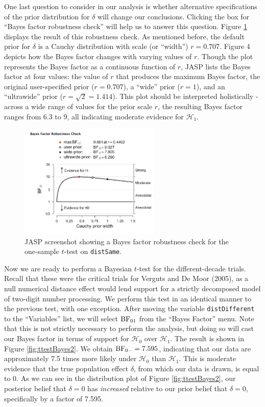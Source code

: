 \documentclass[english,,doc,floatsintext]{apa6}
\begin{document}
One last question to consider in our analysis is whether alternative specifications of the prior distribution for \(\delta\) will change our conclusions. Clicking the box for \enquote{Bayes factor robustness check} will help us to answer this question. Figure \ref{fig:ttestRobust} displays the result of this robustness check. As mentioned before, the default prior for \(\delta\) is a Cauchy distribution with scale (or \enquote{width}) \(r=0.707\). Figure 4 depicts how the Bayes factor changes with varying values of \(r\). Though the plot represents the Bayes factor as a continuous function of \(r\), JASP lists the Bayes factor at four values: the value of \(r\) that produces the maximum Bayes factor, the original user-specified prior (\(r=0.707\)), a \enquote{wide} prior (\(r=1\)), and an \enquote{ultrawide} prior (\(r=\sqrt{2}=1.414\)). This plot should be interpreted holistically - across a wide range of values for the prior scale \(r\), the resulting Bayes factor ranges from 6.3 to 9, all indicating moderate evidence for \(\mathcal{H}_{1}\).

\begin{figure}
\centering
\includegraphics[width=0.6\textwidth,height=\textheight]{figures/ttestRobust.png}
\caption{\label{fig:ttestRobust}JASP screenshot showing a Bayes factor robustness check for the one-sample \(t\)-test on \texttt{distSame}.}
\end{figure}

Now we are ready to perform a Bayesian \(t\)-test for the different-decade trials. Recall that these were the critical trials for Verguts and De Moor (2005), as a null numerical distance effect would lend support for a strictly decomposed model of two-digit number processing. We perform this test in an identical manner to the previous test, with one exception. After moving the variable \texttt{distDifferent} to the \enquote{Variables} list, we will select \(\textnormal{BF}_{01}\) from the \enquote{Bayes Factor} menu. Note that this is not strictly necessary to perform the analysis, but doing so will cast our Bayes factor in terms of support for \(\mathcal{H}_{0}\) over \(\mathcal{H}_{1}\). The result is shown in Figure \ref{fig:ttestBayes2}. We obtain \(\textnormal{BF}_{0-}=7.595\), indicating that our data are approximately 7.5 times more likely under \(\mathcal{H}_{0}\) than \(\mathcal{H}_{1}\). This is moderate evidence that the true population effect \(\delta\), from which our data is drawn, is equal to 0. As we can see in the distribution plot of Figure \ref{fig:ttestBayes2}, our posterior belief that \(\delta=0\) has \emph{increased} relative to our prior belief that \(\delta=0\), specifically by a factor of 7.595.
\end{document}
